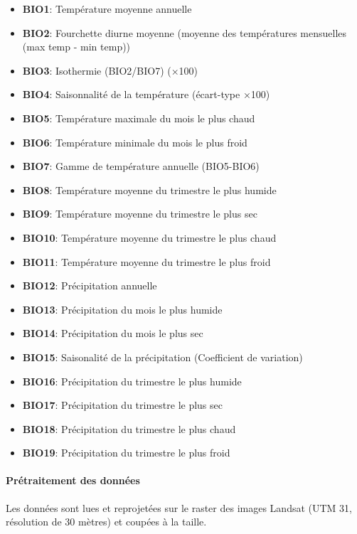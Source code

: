 \documentclass[a4paper, notitlepage, 12pt, krantz2]{krantz}
\providecommand{\tightlist}{%
  \setlength{\itemsep}{0pt}\setlength{\parskip}{0pt}}
\let\oldparagraph\paragraph
\renewcommand{\paragraph}[1]{\oldparagraph{#1}\mbox{}}
\begin{document}
\begin{itemize}
\tightlist
\item
  \textbf{BIO1}: Température moyenne annuelle
\item
  \textbf{BIO2}: Fourchette diurne moyenne (moyenne des températures mensuelles (max temp - min temp))
\item
  \textbf{BIO3}: Isothermie (BIO2/BIO7) (×100)
\item
  \textbf{BIO4}: Saisonnalité de la température (écart-type ×100)
\item
  \textbf{BIO5}: Température maximale du mois le plus chaud
\item
  \textbf{BIO6}: Température minimale du mois le plus froid
\item
  \textbf{BIO7}: Gamme de température annuelle (BIO5-BIO6)
\item
  \textbf{BIO8}: Température moyenne du trimestre le plus humide
\item
  \textbf{BIO9}: Température moyenne du trimestre le plus sec
\item
  \textbf{BIO10}: Température moyenne du trimestre le plus chaud
\item
  \textbf{BIO11}: Température moyenne du trimestre le plus froid
\item
  \textbf{BIO12}: Précipitation annuelle
\item
  \textbf{BIO13}: Précipitation du mois le plus humide
\item
  \textbf{BIO14}: Précipitation du mois le plus sec
\item
  \textbf{BIO15}: Saisonalité de la précipitation (Coefficient de variation)
\item
  \textbf{BIO16}: Précipitation du trimestre le plus humide
\item
  \textbf{BIO17}: Précipitation du trimestre le plus sec
\item
  \textbf{BIO18}: Précipitation du trimestre le plus chaud
\item
  \textbf{BIO19}: Précipitation du trimestre le plus froid
\end{itemize}

\hypertarget{pretraitement-des-donnees}{%
\paragraph{Prétraitement des données}\label{pretraitement-des-donnees}}

Les données sont lues et reprojetées sur le raster des images Landsat (UTM 31, résolution de 30 mètres) et coupées à la taille.
\end{document}
